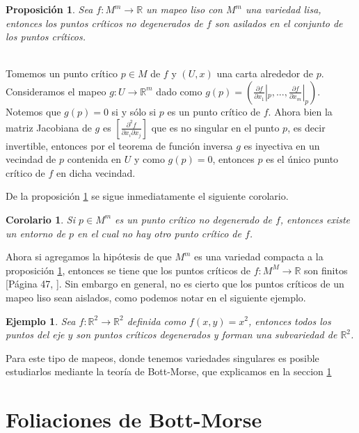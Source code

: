 \documentclass[a4paper,10pt]{book}
\newtheorem{propo}{Proposici\'on}[chapter]
\newtheorem{coro}{Corolario}[chapter]
\newtheorem{eje}{Ejemplo}[chapter]
\begin{document}
\begin{propo}\label{PropoMor}
Sea $f:M^{m}\to\mathbb{R}$ un mapeo liso con $M^{m}$ una variedad lisa, entonces los puntos cr\'iticos no degenerados de $f$ son asilados en el conjunto de los puntos cr\'iticos.   
\end{propo}

\\
Tomemos un punto cr\'itico $p\in M$ de $f$ y $(U,x)$ una carta alrededor de $p$. Consideramos el mapeo $g:U\to\mathbb{R}^{m}$ dado como $g(p)=(\frac{\partial f}{\partial x_{1}}|_{p},...,\frac{\partial f}{\partial x_{m}}|_{p})$. Notemos que $g(p)=0$ si y s\'olo si $p$ es un punto cr\'itico de $f$. Ahora bien la matriz Jacobiana de $g$ es $\left[\frac{\partial^{2} f}{\partial x_{i}\partial x_{j}}\right]$ que es no singular en el punto $p$, es decir invertible, entonces por el teorema de funci\'on inversa $g$ es inyectiva en un vecindad de $p$ contenida en $U$ y como $g(p)=0$, entonces $p$ es el \'unico punto cr\'itico de $f$ en dicha vecindad.
\vspace{5mm}

De la proposici\'on \ref{PropoMor} se sigue inmediatamente el siguiente corolario.  

\begin{coro}\label{cor2}
Si $p\in M^{m}$ es un punto cr\'itico no degenerado de $f$, entonces existe un entorno de $p$ en el cual no hay otro punto cr\'itico de $f$. 
\end{coro}

Ahora si agregamos la hip\'otesis de que $M^{m}$ es una variedad compacta a la proposici\'on \ref{PropoMor}, entonces se tiene que los puntos cr\'iticos de $f:M^{M}\to\mathbb{R}$ son finitos [P\'agina 47, \cite{Matsumoto}].  Sin embargo en general, no es cierto que los puntos cr\'iticos de un mapeo liso sean aislados, como podemos notar en el siguiente ejemplo.

\begin{eje}\label{ejeNoDege}
Sea $f:\mathbb{R}^{2}\to\mathbb{R}^{2}$ definida como $f(x,y)=x^{2}$, entonces todos los puntos del eje $y$ son puntos cr\'iticos degenerados y forman una subvariedad de $\mathbb{R}^{2}$.
\end{eje}

Para este tipo de mapeos, donde tenemos variedades singulares es posible estudiarlos mediante la teor\'ia de Bott-Morse, que explicamos en la seccion \ref{1.3}

\section{Foliaciones de Bott-Morse}\label{1.3}
\end{document}
